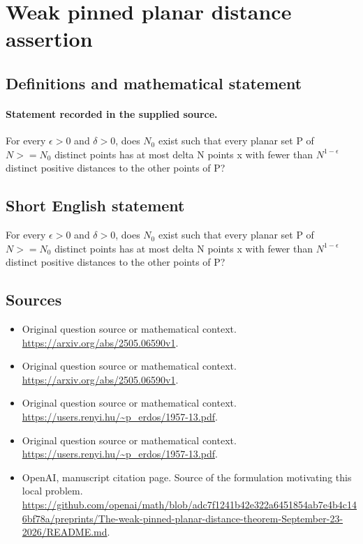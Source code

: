 \documentclass[11pt]{article}
\begin{document}
\section*{Weak pinned planar distance assertion}\label{statement}
\subsection{Definitions and mathematical statement}
\paragraph{Statement recorded in the supplied source.}
For every $\epsilon >0$ and $\delta >0$, does $N_0$ exist such that every planar set P of $N>=N_0$ distinct points has at most delta N points x with fewer than $N^{1-\epsilon }$ distinct positive distances to the other points of P?
\subsection{Short English statement}
For every $\epsilon >0$ and $\delta >0$, does $N_0$ exist such that every planar set P of $N>=N_0$ distinct points has at most delta N points x with fewer than $N^{1-\epsilon }$ distinct positive distances to the other points of P?
\subsection{Sources}
\begin{itemize}
\item[S1] Original question source or mathematical context.
\url{https://arxiv.org/abs/2505.06590v1}.
\item[S2] Original question source or mathematical context.
\url{https://arxiv.org/abs/2505.06590v1}.
\item[S3] Original question source or mathematical context.
\url{https://users.renyi.hu/~p_erdos/1957-13.pdf}.
\item[S4] Original question source or mathematical context.
\url{https://users.renyi.hu/~p_erdos/1957-13.pdf}.
\item[S5] OpenAI, manuscript citation page. Source of the formulation motivating this local problem.
\url{https://github.com/openai/math/blob/adc7f1241b42e322a6451854ab7e4b4c146bf78a/preprints/The-weak-pinned-planar-distance-theorem-September-23-2026/README.md}.
\end{itemize}
\end{document}
